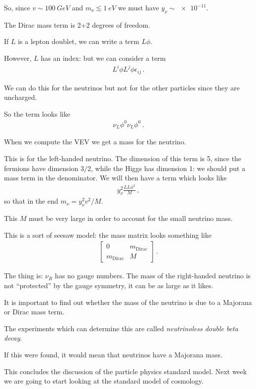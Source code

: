 \documentclass[main.tex]{subfiles}
\begin{document}
So, since \(v \sim \SI{100}{GeV}\) and \(m_{\nu } \lesssim \SI{1}{eV}\) we must have \(y_{\nu } \sim \num{e-11}\).

The Dirac mass term is 2+2 degrees of freedom. 

If \(L\) is a lepton doublet, we can write a term \(L \phi \).

However, \(L\) has an index: but we can consider a term 
%
\begin{align}
L^{i} \phi L^{j} \phi \epsilon_{ij}
\,.
\end{align}

We can do this for the neutrinos but not for the other particles since they are uncharged. 

So the term looks like 
%
\begin{align}
\nu_{L} \phi^{0} \nu_{L} \phi^{0}
\,.
\end{align}

When we compute the VEV we get a mass for the neutrino. 

This is for the left-handed neutrino. The dimension of this term is 5, since the fermions have dimension \(3/2\), while the Higgs has dimension 1: we should put a mass term in the denominator.
We will then have a term which looks like 
%
\begin{align}
y^2_{\nu } \frac{L L \phi^2}{M}
\,,
\end{align}
%
so that in the end \(m_{\nu } = y^2_{\nu } v^2 / M\).

This \(M\) must be very large in order to account for the small neutrino mass.

This is a sort of seesaw model: the mass matrix looks something like 
%
\begin{align}
\left[\begin{array}{cc}
0 & m _{\text{Dirac}} \\ 
m _{\text{Dirac}} & M
\end{array}\right]
\,.
\end{align}

The thing is: \(\nu_{R}\) has no gauge numbers. 
The mass of the right-handed neutrino is not ``protected'' by the gauge symmetry, it can be as large as it likes. 


It is important to find out whether the mass of the neutrino is due to a Majorana or Dirac mass term.

The experiments which can determine this are called \emph{neutrinoless double beta decay}.

If this were found, it would mean that neutrinos have a Majorana mass.

This concludes the discussion of the particle physics standard model. Next week we are going to start looking at the standard model of cosmology.
\end{document}
